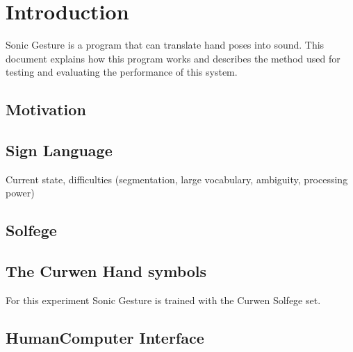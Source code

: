 
\chapter{Introduction}
\label{ch:intro}

Sonic Gesture is a program that can translate hand poses into sound. This
document explains how this program works and describes the method used for
testing and evaluating the performance of this system.

\section{Motivation}

\section{Sign Language}
Current state, difficulties (segmentation, large vocabulary, ambiguity, processing power)

\section{Solfege}


\section{The Curwen Hand symbols}
For this experiment Sonic Gesture is trained with the Curwen Solfege set\cite{choksy1999}.

\section{Human\-Computer Interface}
